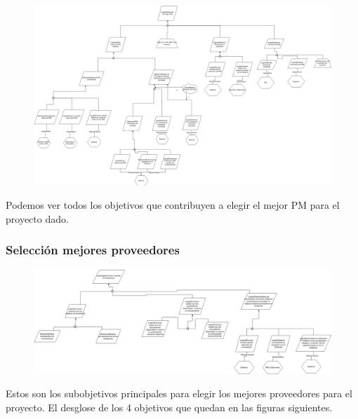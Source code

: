 \begin{figure}[H]
    \centering
    \includegraphics[width=9.5in, keepaspectratio, angle=90]{imagenes/objetivos-seleccion-mejor-pm.png}
\end{figure}

Podemos ver todos los objetivos que contribuyen a elegir el mejor PM para el proyecto dado.

\subsubsection{Selección mejores proveedores}

\begin{figure}[H]
    \centering
    \includegraphics[width=9in, keepaspectratio, angle=90]{imagenes/objetivos-seleccion-mejor-proveedor-principal.png}
\end{figure}

Estos son los subobjetivos principales para elegir los mejores proveedores para el proyecto. El desglose de los 4 objetivos que quedan en las figuras siguientes.

